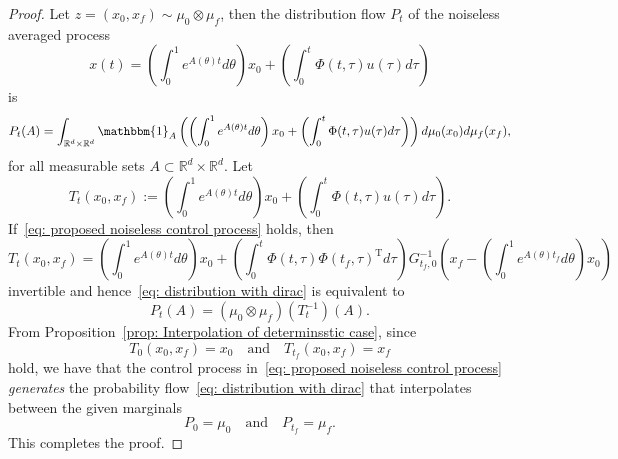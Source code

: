 \documentclass[12pt]{amsart}
\newcommand{\R}{\mathbb{R}}
\renewcommand{\(}{\left (}
\renewcommand{\)}{\right )}
\numberwithin{equation}{section}
\begin{document}
\begin{proof}
Let $z=(x_0,x_f)\sim\mu_0\otimes\mu_f$,  then the distribution flow $P_t$ of the noiseless averaged process 
\begin{equation}\label{eq: noiseless averaged process}
x(t)=\left(\int_0^1e^{A(\theta)t}d\theta\right) x_0+\left(\int_{0}^{t}\Phi(t,\tau)u(\tau)d\tau\right) 
\end{equation}
is 
\begin{equation}\label{eq: distribution with dirac}
P_t(A)=\int_{\R^d\times\R^d}\mathbbm{1}_A\left(\left(\int_0^1e^{A(\theta)t}d\theta\right) x_0+\left(\int_{0}^{t}\Phi(t,\tau)u(\tau)d\tau\right)\right)d\mu_0(x_0)d\mu_f(x_f),    
\end{equation}
for all measurable sets $A\subset\R^d\times\R^d$. Let 
\[
T_t(x_0,x_f):=\left(\int_0^1e^{A(\theta)t}d\theta\right) x_0+\left(\int_{0}^{t}\Phi(t,\tau)u(\tau)d\tau\right). 
\]
If~\eqref{eq: proposed noiseless control process} holds, then %
\[
T_t(x_0,x_f)=\left(\int_0^1e^{A(\theta)t}d\theta\right) x_0+\left(\int_{0}^{t}\Phi(t,\tau)\Phi(t_f,\tau)^{\mathrm{T}}d\tau\right) G_{t_f,0}^{-1}\left(x_f-\left(\int_{0}^{1}e^{A(\theta)t_f}d\theta\right) x_0\right)
\]
invertible and hence~\eqref{eq: distribution with dirac} is equivalent to 
\begin{equation}\label{eq: distribution flow}
P_t(A)=(\mu_0\otimes\mu_f)(T_{t}^{-1})(A).
\end{equation}
From Proposition~\ref{prop: Interpolation of determinsstic case}, since
\[
T_0(x_0,x_f)=x_0\quad\text{and}\quad T_{t_f}(x_0,x_f)=x_f
\]
hold, we have that  the control process in~\eqref{eq: proposed noiseless control process} \emph{generates} the probability flow~\eqref{eq: distribution with dirac} that interpolates between the given marginals  
\[
P_0=\mu_0\quad\text{and}\quad P_{t_f}=\mu_f.
\]
This completes the proof.
\end{proof}
\end{document}
